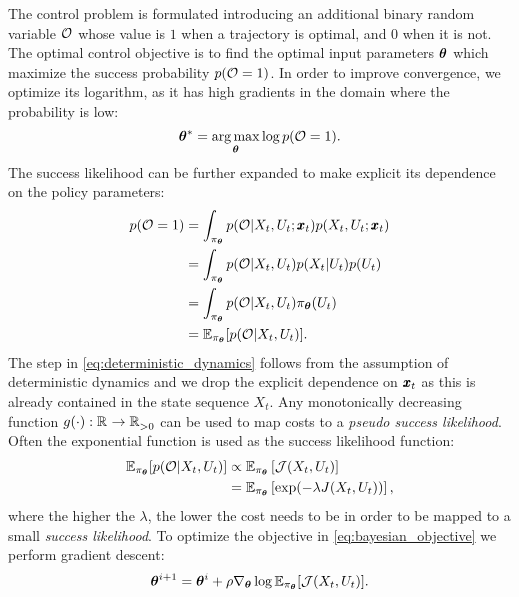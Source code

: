 The control problem is formulated introducing an additional binary random variable $\mathcal{O}$ whose value is $1$ when a trajectory is optimal, and $0$ when it is not. The optimal control objective is to find the optimal input parameters $\boldsymbol{\theta}$ which maximize the success probability $p(\mathcal{O} = 1)$. In order to improve convergence, we optimize its logarithm, as it has high gradients in the domain where the probability is low: 
\begin{equation} \label{eq:bayesian_objective}
    \boldsymbol{\theta}^* = \underset{\boldsymbol{\theta}}{\arg\max} \log p(\mathcal{O} = 1).
\end{equation}
The success likelihood can be further expanded to make explicit its dependence on the policy parameters:
\begin{align}
        p(\mathcal{O} = 1)
        &= \int_{\pi_{\boldsymbol{\theta}}} p(\mathcal{O} | X_t, U_t; \pmb{x}_t) p(X_t, U_t; \pmb{x}_t) \\
        &= \int_{\pi_{\boldsymbol{\theta}}}p(\mathcal{O} | X_t, U_t) p(X_t| U_t) p(U_t) \label{eq:deterministic_dynamics}\\
        &= \int_{\pi_{\boldsymbol{\theta}}}p(\mathcal{O} | X_t, U_t) \pi_{\boldsymbol{\theta}}(U_t) \\
        &= \mathbb{E}_{\pi_{\boldsymbol{\theta}}} [p(\mathcal{O} | X_t, U_t)].
        \label{eq:input_to_params}
\end{align}
The step in \eqref{eq:deterministic_dynamics} follows from the assumption of deterministic dynamics and we drop the explicit dependence on $\pmb{x}_t$ as this is already contained in the state sequence $X_t$. Any monotonically decreasing function $g(\cdot): \mathbb{R}^{} \rightarrow \mathbb{R}^{}_{>0}$ can be used to map costs to a \textit{pseudo success likelihood}. Often the exponential function is used as the success likelihood function:
\begin{align}
    \mathbb{E}_{\pi_{\boldsymbol{\theta}}} [p(\mathcal{O} | X_t, U_t)]  
    &\propto \mathbb{E}_{\pi_{\boldsymbol{\theta}}} \left[ \mathcal{J}(X_t, U_t) \right] \\
    &= \mathbb{E}_{\pi_{\boldsymbol{\theta}}} \left[ \exp (-\lambda J(X_t, U_t)) \right],
\end{align}
where the higher the $\lambda$, the lower the cost needs to be in order to be mapped to a small \textit{success likelihood}. To optimize the objective in \eqref{eq:bayesian_objective} we perform gradient descent:
\begin{equation}
    \boldsymbol{\theta}^{i+1} 
    = \boldsymbol{\theta}^i + \rho \nabla_{ \boldsymbol{\theta}}\log \mathbb{E}_{\pi_{\boldsymbol{\theta}}} [\mathcal{J}(X_t, U_t)].
\end{equation}

